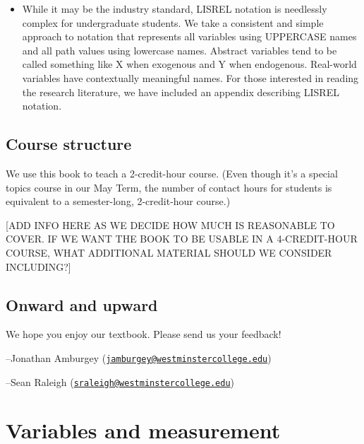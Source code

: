\documentclass[
]{book}
\providecommand{\tightlist}{%
  \setlength{\itemsep}{0pt}\setlength{\parskip}{0pt}}
\begin{document}
\begin{itemize}
  \begin{itemize}
  \tightlist
  \item
    While it may be the industry standard, LISREL notation is needlessly complex for undergraduate students. We take a consistent and simple approach to notation that represents all variables using UPPERCASE names and all path values using lowercase names. Abstract variables tend to be called something like X when exogenous and Y when endogenous. Real-world variables have contextually meaningful names. For those interested in reading the research literature, we have included an appendix describing LISREL notation.
  \end{itemize}
\end{itemize}

\hypertarget{course-structure}{%
\section*{Course structure}\label{course-structure}}

We use this book to teach a 2-credit-hour course. (Even though it's a special topics course in our May Term, the number of contact hours for students is equivalent to a semester-long, 2-credit-hour course.)

{[}ADD INFO HERE AS WE DECIDE HOW MUCH IS REASONABLE TO COVER. IF WE WANT THE BOOK TO BE USABLE IN A 4-CREDIT-HOUR COURSE, WHAT ADDITIONAL MATERIAL SHOULD WE CONSIDER INCLUDING?{]}

\hypertarget{onward-and-upward}{%
\section*{Onward and upward}\label{onward-and-upward}}

We hope you enjoy our textbook. Please send us your feedback!

--Jonathan Amburgey (\href{mailto:jamburgey@westminstercollege.edu}{\nolinkurl{jamburgey@westminstercollege.edu}})

--Sean Raleigh (\href{mailto:sraleigh@westminstercollege.edu}{\nolinkurl{sraleigh@westminstercollege.edu}})

\hypertarget{variables}{%
\chapter{Variables and measurement}\label{variables}}
\end{document}
